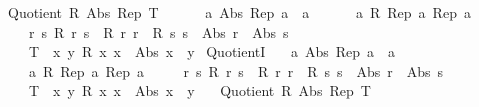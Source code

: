 \begin{isabellebody}
\endisatagproof
{\isafoldproof}%
%
\isadelimproof
%
\endisadelimproof
%
\isadelimdocument
%
\endisadelimdocument
%
\isatagdocument
%
\isamarkuptrue%
%
\endisatagdocument
{\isafolddocument}%
%
\isadelimdocument
%
\endisadelimdocument
{}\isamarkupfalse%
\isanewline
\ \ {\isachardoublequoteopen}Quotient\ R\ Abs\ Rep\ T\ {\isasymlongleftrightarrow}\isanewline
\ \ \ \ \ {\isacharparenleft}{\kern0pt}{\isasymforall}a{\isachardot}{\kern0pt}\ Abs\ {\isacharparenleft}{\kern0pt}Rep\ a{\isacharparenright}{\kern0pt}\ {\isacharequal}{\kern0pt}\ a{\isacharparenright}{\kern0pt}\ {\isasymand}\isanewline
\ \ \ \ \ {\isacharparenleft}{\kern0pt}{\isasymforall}a{\isachardot}{\kern0pt}\ R\ {\isacharparenleft}{\kern0pt}Rep\ a{\isacharparenright}{\kern0pt}\ {\isacharparenleft}{\kern0pt}Rep\ a{\isacharparenright}{\kern0pt}{\isacharparenright}{\kern0pt}\ {\isasymand}\isanewline
\ \ \ \ \ {\isacharparenleft}{\kern0pt}{\isasymforall}r\ s{\isachardot}{\kern0pt}\ R\ r\ s\ {\isasymlongleftrightarrow}\ R\ r\ r\ {\isasymand}\ R\ s\ s\ {\isasymand}\ Abs\ r\ {\isacharequal}{\kern0pt}\ Abs\ s{\isacharparenright}{\kern0pt}\ {\isasymand}\isanewline
\ \ \ \ \ T\ {\isacharequal}{\kern0pt}\ {\isacharparenleft}{\kern0pt}{\isasymlambda}x\ y{\isachardot}{\kern0pt}\ R\ x\ x\ {\isasymand}\ Abs\ x\ {\isacharequal}{\kern0pt}\ y{\isacharparenright}{\kern0pt}{\isachardoublequoteclose}\isanewline
\isanewline
{}\isamarkupfalse%
\ QuotientI{\isacharcolon}{\kern0pt}\isanewline
\ \ \ {\isachardoublequoteopen}{\isasymAnd}a{\isachardot}{\kern0pt}\ Abs\ {\isacharparenleft}{\kern0pt}Rep\ a{\isacharparenright}{\kern0pt}\ {\isacharequal}{\kern0pt}\ a{\isachardoublequoteclose}\isanewline
\ \ \ \ \ {\isachardoublequoteopen}{\isasymAnd}a{\isachardot}{\kern0pt}\ R\ {\isacharparenleft}{\kern0pt}Rep\ a{\isacharparenright}{\kern0pt}\ {\isacharparenleft}{\kern0pt}Rep\ a{\isacharparenright}{\kern0pt}{\isachardoublequoteclose}\isanewline
\ \ \ \ \ {\isachardoublequoteopen}{\isasymAnd}r\ s{\isachardot}{\kern0pt}\ R\ r\ s\ {\isasymlongleftrightarrow}\ R\ r\ r\ {\isasymand}\ R\ s\ s\ {\isasymand}\ Abs\ r\ {\isacharequal}{\kern0pt}\ Abs\ s{\isachardoublequoteclose}\isanewline
\ \ \ \ \ {\isachardoublequoteopen}T\ {\isacharequal}{\kern0pt}\ {\isacharparenleft}{\kern0pt}{\isasymlambda}x\ y{\isachardot}{\kern0pt}\ R\ x\ x\ {\isasymand}\ Abs\ x\ {\isacharequal}{\kern0pt}\ y{\isacharparenright}{\kern0pt}{\isachardoublequoteclose}\isanewline
\ \ \ {\isachardoublequoteopen}Quotient\ R\ Abs\ Rep\ T{\isachardoublequoteclose}\isanewline

\end{isabellebody}
